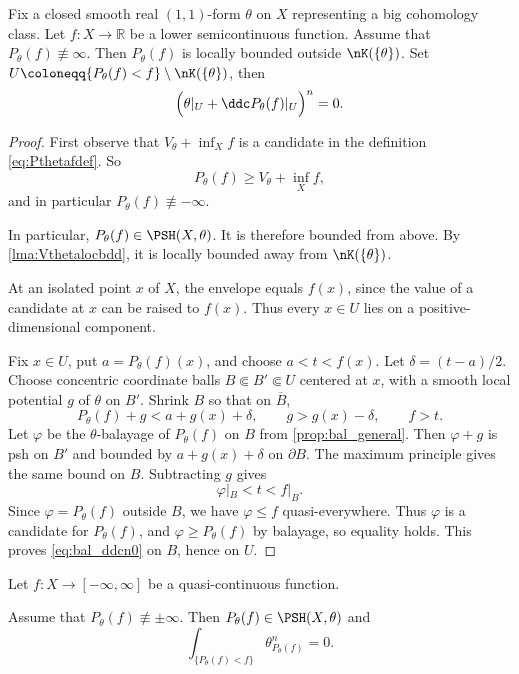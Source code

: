 \begin{lemma}\label{lma:BT_freeenvelope}
    Fix a closed smooth real $(1,1)$-form $\theta$ on $X$ representing a big cohomology class.
    Let $f\colon X\rightarrow \mathbb{R}$ be a lower semicontinuous function.
    Assume that $P_{\theta}(f)\not\equiv \infty$. Then $P_{\theta}(f)$ is locally bounded outside $\nK(\{\theta\})$. Set $U\coloneqq \{P_{\theta}(f)<f\}\setminus \nK(\{\theta\})$, then
    \begin{equation}\label{eq:bal_ddcn0}
        \Bigl(\theta|_U+\ddc P_{\theta}(f)|_U\Bigr)^n=0.
    \end{equation}
\end{lemma}
\begin{proof}
    First observe that $V_{\theta}+\inf_X f$ is a candidate in the definition \eqref{eq:Pthetafdef}. So
    \[
    P_{\theta}(f)\geq V_{\theta}+\inf_X f,
    \]
    and in particular $P_{\theta}(f)\not\equiv -\infty$.

    In particular, $P_{\theta}(f)\in \PSH(X,\theta)$. It is therefore bounded from above. By \cref{lma:Vthetalocbdd}, it is locally bounded away from $\nK(\{\theta\})$.

    At an isolated point $x$ of $X$, the envelope equals $f(x)$, since the value of a candidate at $x$ can be raised to $f(x)$. Thus every $x\in U$ lies on a positive-dimensional component.

    Fix $x\in U$, put $a=P_{\theta}(f)(x)$, and choose $a<t<f(x)$. Let $\delta=(t-a)/2$. Choose concentric coordinate balls $B\Subset B'\Subset U$ centered at $x$, with a smooth local potential $g$ of $\theta$ on $B'$. Shrink $B$ so that on $\overline{B}$,
    \begin{equation}\label{eq:PthetafBp_temp1}
        P_{\theta}(f)+g<a+g(x)+\delta,\qquad g>g(x)-\delta,\qquad f>t.
    \end{equation}
    Let $\varphi$ be the $\theta$-balayage of $P_{\theta}(f)$ on $B$ from \cref{prop:bal_general}. Then $\varphi+g$ is psh on $B'$ and bounded by $a+g(x)+\delta$ on $\partial B$. The maximum principle gives the same bound on $B$. Subtracting $g$ gives
    \[
        \varphi|_B<t<f|_B.
    \]
    Since $\varphi=P_{\theta}(f)$ outside $B$, we have $\varphi\leq f$ quasi-everywhere. Thus $\varphi$ is a candidate for $P_{\theta}(f)$, and $\varphi\geq P_{\theta}(f)$ by balayage, so equality holds. This proves \eqref{eq:bal_ddcn0} on $B$, hence on $U$.
\end{proof}

\begin{theorem}\label{thm:concentration}
    Let $f\colon X\rightarrow [-\infty,\infty]$ be a quasi-continuous function.

    Assume that $P_{\theta}(f)\not\equiv \pm\infty$. Then $P_{\theta}(f)\in \PSH(X,\theta)$ and
    \begin{equation}\label{eq:Pthetafconc}
    \int_{\{P_{\theta}(f)<f\}} \theta_{P_{\theta}(f)}^n=0.
    \end{equation}
\end{theorem}

